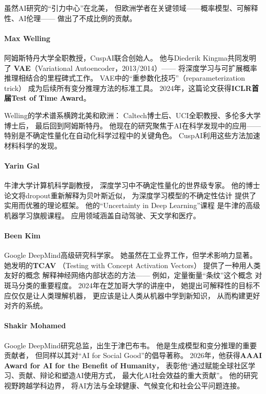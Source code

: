 虽然AI研究的``引力中心''在北美，
但欧洲学者在关键领域——概率模型、可解释性、AI伦理——
做出了不成比例的贡献。

\paragraph{Max Welling}
阿姆斯特丹大学全职教授，CuspAI联合创始人。
他与Diederik Kingma共同发明了
\textbf{VAE}（Variational Autoencoder，2013/2014）——
将深度学习与可扩展概率推理相结合的里程碑式工作。
VAE中的``重参数化技巧''（reparameterization trick）
成为后续所有变分推理方法的标准工具。
2024年，这篇论文获得\textbf{ICLR首届Test of Time Award}。

Welling的学术谱系横跨北美和欧洲：
Caltech博士后、UCI全职教授、多伦多大学博士后，
最后回到阿姆斯特丹。
他现在的研究聚焦于AI在科学发现中的应用——
特别是不确定性量化在自动化科学过程中的关键角色。
CuspAI利用这些方法加速材料科学的发现。

\paragraph{Yarin Gal}
牛津大学计算机科学副教授，
深度学习中不确定性量化的世界级专家。
他的博士论文将dropout重新解释为贝叶斯近似，
为深度学习模型的不确定性估计
提供了实用而优雅的理论框架。
他的``Uncertainty in Deep Learning''课程
是牛津的高级机器学习旗舰课程。
应用领域涵盖自动驾驶、天文学和医疗。

\paragraph{Been Kim}
Google DeepMind高级研究科学家。
她虽然在工业界工作，但学术影响力显著。
她发明的\textbf{TCAV}
（Testing with Concept Activation Vectors）
提供了一种用人类友好的概念
解释神经网络内部状态的方法——
例如，定量衡量``条纹''这个概念
对斑马分类的重要程度。
2024年在芝加哥大学的讲座中，
她提出可解释性的目标不应仅仅是让人类理解机器，
更应该是让人类从机器中学到新知识，
从而构建更好对齐的系统。

\paragraph{Shakir Mohamed}
Google DeepMind研究总监，出生于津巴布韦。
他是生成模型和变分推理的重要贡献者，
但同样以其对``AI for Social Good''的倡导著称。
2026年，他获得\textbf{AAAI Award for AI for the Benefit of Humanity}，
表彰他``通过赋能全球社区学习、贡献、辩论和塑造AI使用方式，
最大化AI社会效益的重大贡献''。
他的研究视野跨越学科边界，
将AI方法与全球健康、气候变化和社会公平问题连接。


